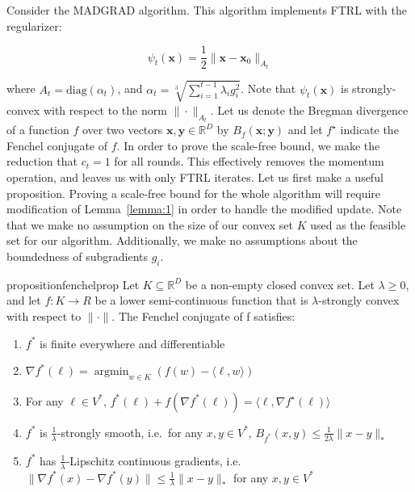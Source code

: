 \documentclass{article}
\newcommand{\R}{\mathbb{R}}
\newcommand{\argmin}{\mathop{\text{argmin}}}
\newcommand{\diag}{\text{diag}}
\newcommand{\bx}{\mathbf{x}}
\newcommand{\by}{\mathbf{y}}
\begin{document}
Consider the MADGRAD algorithm. This algorithm implements FTRL with the regularizer: 

\[
  \psi_t(\bx) = \frac{1}{2} \|\bx - \bx_0 \|_{A_t}
\]

where $A_t = \diag(\alpha_t)$, and $\alpha_t = \sqrt[3]{\sum_{i=1}^{t-1}\lambda_i g_i^2}$. Note that $\psi_t(\bx)$ is
strongly-convex with respect to the norm $\| \cdot \|_{A_t}$. Let us denote the Bregman divergence of a function $f$
over two vectors $\bx, \by \in \R^D$ by $B_f(\bx; \by)$ and let $f^\star$ indicate the Fenchel conjugate of $f$. In
order to prove the scale-free bound, we make the reduction that $c_t = 1$ for all rounds. This effectively removes the
momentum operation, and leaves us with only FTRL iterates. Let us first make a useful proposition. Proving a scale-free
bound for the whole algorithm will require modification of Lemma~\ref{lemma:1} in order to handle the modified update.
Note that we make no assumption on the size of our convex set $K$ used as the feasible set for our algorithm.
Additionally, we make no assumptions about the boundedness of subgradients $g_i$. 

\begin{restatable}{proposition}{fenchelprop}\label{prop:1}
  Let $K \subseteq \R^D$ be a non-empty closed convex set. Let $\lambda \geq 0$, and let $f: K \rightarrow R$ be a lower
  semi-continuous function that is $\lambda$-strongly convex with respect to $\| \cdot \|$. The Fenchel conjugate of f
  satisfies:

  \begin{enumerate}
    \item $f^*$ is finite everywhere and differentiable
    \item $\nabla f^* (\ell) = \argmin_{w \in K}(f(w) - \langle \ell, w \rangle)$
    \item For any $\ell \in V^*$, $f^*(\ell) + f(\nabla f^*(\ell)) = \langle \ell, \nabla f^\star (\ell) \rangle$
    \item $f^*$ is $\frac{1}{\lambda}$-strongly smooth, i.e.\ for any $x, y \in V^*$, $B_{f^*}(x, y) \leq
      \frac{1}{2\lambda}\|x - y \|_*$
    \item $f^*$ has $\frac{1}{\lambda}$-Lipschitz continuous gradients, i.e. $\| \nabla f^*(x) - \nabla f^*(y)\| \leq
      \frac{1}{\lambda}\|x - y\|_*$ for any $x, y \in V^*$
  \end{enumerate}
\end{restatable}
\end{document}
